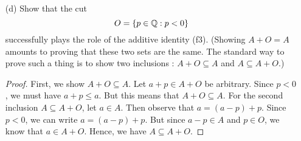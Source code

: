 \begin{enumerate}
\begin{proof}
        \end{proof}
    \item[(d)] Show that the cut 
        \[  O = \{ p \in \mathbb{Q} : p < 0  \}  \] successfully plays the role of the additive identity (f3). (Showing \( A + O = A  \) amounts to proving that these two sets are the same. The standard way to prove such a thing is to show two inclusions : \( A  + O \subseteq A  \) and \( A \subseteq A + O  \).) 
        \begin{proof}
        First, we show \( A + O \subseteq A  \). Let \( a + p \in  A+ O  \) be arbitrary. Since \(  p < 0  \), we must have \(  a + p \leq a  \). But this means that \( A + O \subseteq A  \). For the second inclusion \( A \subseteq A + O  \), let \( a \in A  \). Then observe that \( a = (a-p) + p \). Since \( p < 0  \), we can write \(  a = (a-p) + p  \). But since \( a - p \in A  \) and \( p \in O  \), we know that \( a \in A + O  \). Hence, we have \( A \subseteq A + O  \).        
        \end{proof}
\end{enumerate}


